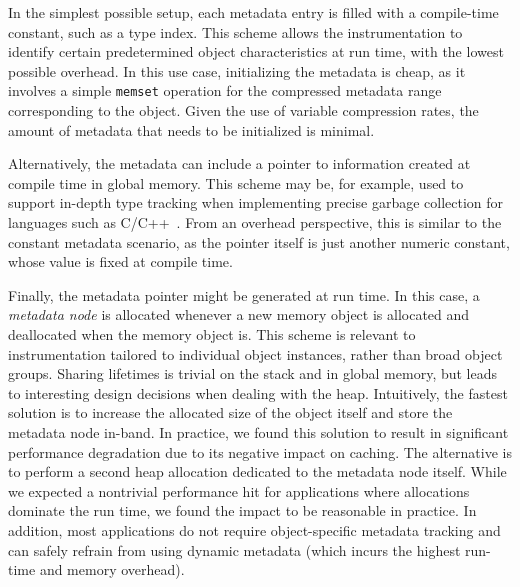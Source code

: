 In the simplest possible setup, each metadata entry is filled with a compile-time constant,
such as a type index. This scheme allows the instrumentation to identify certain predetermined object characteristics at run time, with the lowest possible overhead. In this use case, initializing the
metadata is cheap, as it involves a simple \texttt{memset} operation for the compressed metadata range corresponding to the object. Given the use of variable compression rates, the amount of metadata that needs to be initialized is minimal.

Alternatively, the metadata can include a pointer to information created
at compile time in global memory. This scheme may be, for example, used to
support in-depth type tracking when implementing precise garbage collection
for languages such as C/C++~\cite{rafkind2009precise}.
From an overhead perspective, this is similar to the constant metadata scenario, as the pointer itself is just another numeric constant,
whose value is fixed at compile time.

Finally, the metadata pointer might be generated at run time.
In this case, a \emph{metadata node} is allocated whenever a new memory object
is allocated and deallocated when the memory object is. 
This scheme is relevant to instrumentation tailored to individual object
instances, rather than broad object groups. Sharing lifetimes is trivial on the
stack and in global memory, but leads to interesting design decisions when dealing
with the heap. Intuitively, the fastest solution is to increase the allocated size
of the object itself and store the metadata node in-band. In practice, we found
this solution to result in significant performance degradation due to its
negative  impact on caching.
The alternative is to perform a second heap allocation dedicated to the metadata node 
itself. While we expected a nontrivial performance hit for applications where allocations
dominate the run time, we found the impact to be reasonable in practice.
In addition, most applications do not require object-specific metadata tracking
and can safely refrain from using dynamic metadata (which incurs the highest run-time and memory overhead).

